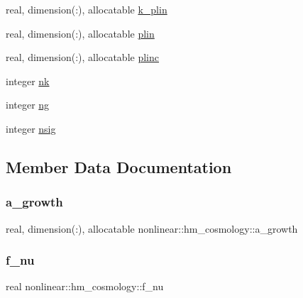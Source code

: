 \begin{DoxyCompactItemize}
\item 
real, dimension(\+:), allocatable \mbox{\hyperlink{structnonlinear_1_1hm__cosmology_abc7b31f0e51ee70fa841e24d9e59e6e7}{k\+\_\+plin}}
\item 
real, dimension(\+:), allocatable \mbox{\hyperlink{structnonlinear_1_1hm__cosmology_ac98ce192f2aa1b6210e8963ee8179a2e}{plin}}
\item 
real, dimension(\+:), allocatable \mbox{\hyperlink{structnonlinear_1_1hm__cosmology_a603a67738d4ae080eaf2c80f3360381a}{plinc}}
\item 
integer \mbox{\hyperlink{structnonlinear_1_1hm__cosmology_a871b066cea0c3833bda35e5b2b492a03}{nk}}
\item 
integer \mbox{\hyperlink{structnonlinear_1_1hm__cosmology_a744b8bb9d950ffdcbc7f832d09577731}{ng}}
\item 
integer \mbox{\hyperlink{structnonlinear_1_1hm__cosmology_a3553d3fb4e590910dedfe4c6c288ca08}{nsig}}
\end{DoxyCompactItemize}


\subsection{Member Data Documentation}
\mbox{\label{structnonlinear_1_1hm__cosmology_a2aae32088cb58980a79d6183a19c5507}} 
\subsubsection{\texorpdfstring{a\+\_\+growth}{a\_growth}}
{\footnotesize\ttfamily real, dimension(\+:), allocatable nonlinear\+::hm\+\_\+cosmology\+::a\+\_\+growth\hspace{0.3cm}{\ttfamily [private]}}

\mbox{\label{structnonlinear_1_1hm__cosmology_ae07efa43a837bdffc185f3fb9be40445}} 
\subsubsection{\texorpdfstring{f\+\_\+nu}{f\_nu}}
{\footnotesize\ttfamily real nonlinear\+::hm\+\_\+cosmology\+::f\+\_\+nu\hspace{0.3cm}{\ttfamily [private]}}

